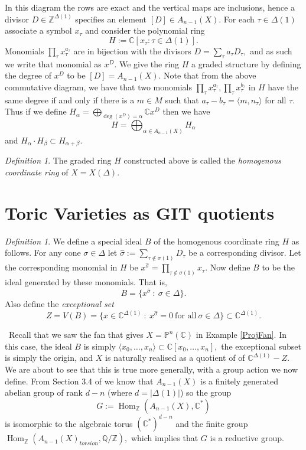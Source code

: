\documentclass[BSc]{usydthesis}
\numberwithin{equation}{chapter}
\theoremstyle{remark}
\newtheorem{Definition}[equation]{Definition}
\newcommand{\C}{\mathbb{C}}
\newcommand{\Z}{\mathbb{Z}}
\newcommand{\Proj}{\mathbb{P}}
\begin{document}
In this diagram the rows are exact and the vertical maps are inclusions, hence a divisor $D\in \Z^{\Delta(1)}$ specifies an element $[D] \in A_{n-1}(X).$ 
\newline
 For each $\tau\in \Delta(1)$ associate a symbol $x_{\tau}$ and consider the polynomial ring $$H:= \C[x_{\tau} : \tau\in \Delta(1)].$$ Monomials $\prod_{\tau} x_{\tau}^{a_{\tau}}$ are in bijection with the divisors $D = \sum_{\tau} a_{\tau} D_{\tau},$ and as such we write that monomial as $x^D.$ We give the ring $H$ a graded structure by defining the degree of $x^D$ to be $[D] = A_{n-1}(X).$ Note that from the above commutative diagram, we have that two monomials $\prod_{\tau} x_{\tau}^{a_{\tau}}, \prod_{\tau} x_{\tau}^{b_{\tau}}$ in $H$ have the same degree if and only if there is a $m\in M$ such that $a_{\tau}-b_{\tau} = \langle m, n_{\tau}\rangle$ for all $\tau.$ Thus if we define $H_{\alpha} = \bigoplus_{\operatorname{deg}(x^D)=\alpha} \C x^D$ then we have $$H = \bigoplus_{ \alpha \in A_{n-1}(X)} H_{\alpha}$$ and $H_{\alpha} \cdot H_{\beta} \subset H_{\alpha+\beta}.$ 

\begin{Definition}
The graded ring $H$ constructed above is called the {\em homogenous coordinate ring} of $X=X(\Delta).$
\end{Definition}

\section{Toric Varieties as GIT quotients}

\begin{Definition}
 We define a special ideal $B$ of the homogenous coordinate ring $H$ as follows. For any cone $\sigma \in \Delta$ let $\hat{\sigma}:= \sum_{ \tau\notin \sigma(1)} D_{\tau}$ be a corresponding divisor. Let the corresponding monomial in $H$ be $x^{ \hat{\sigma}} = \prod_{\tau \notin \sigma(1)} x_{\tau}.$ Now define $B$ to be the ideal generated by these monomials. That is, $$ B = \{ x^{\hat{\sigma}} \ : \ \sigma\in \Delta \}.$$ Also define the {\em exceptional set} $$Z = V(B) = \{ x\in \C^{\Delta(1)} \ : \ x^{ \hat{\sigma}} =0 \ \text{for all} \ \sigma \in \Delta \} \subset \C^{\Delta(1)}.$$
\end{Definition}
\
Recall that we saw the fan that gives $X=\Proj^n(\C)$ in Example \ref{ProjFan}. In this case, the ideal $B$ is simply $ \langle x_0, \ldots, x_n \rangle \subset \C[x_0, \ldots, x_n],$ the exceptional subset is simply the origin, and $X$ is naturally realised as a quotient of of $\C^{\Delta(1)}-Z.$ We are about to see that this is true more generally, with a group action we now define. 
\newline
From Section 3.4 of \cite{Fulton:Toric} we know that $A_{n-1}(X)$ is a finitely generated abelian group of rank $ d-n$ (where $d=|\Delta(1)|$) so the group $$G:= \operatorname{Hom}_{\Z} (A_{n-1}(X), \C^*)$$ is isomorphic to the algebraic torus $(\C^*)^{d-n}$ and the finite group $\operatorname{Hom}_{\Z}(A_{n-1}(X)_{torsion}, \mathbb{Q}/\Z),$ which implies that $G$ is a reductive group. 
\end{document}
